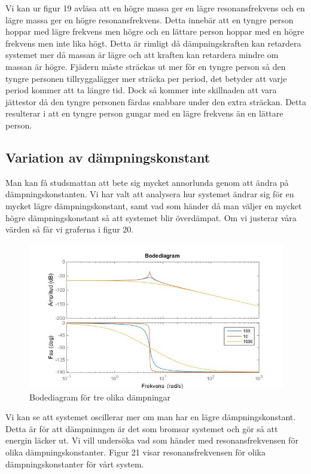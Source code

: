 \documentclass[10pt,a4paper]{article}
\begin{document}
Vi kan ur figur 19 avläsa att en högre massa ger en lägre resonansfrekvens och en lägre massa ger en högre resonansfrekvens. Detta innebär att en tyngre person hoppar med lägre frekvens men högre och en lättare person hoppar med en högre frekvens men inte lika högt. Detta är rimligt då dämpningskraften kan retardera systemet mer då massan är lägre och att kraften kan retardera mindre om massan är högre. Fjädern måste sträckas ut mer för en tyngre person så den tyngre personen tillryggalägger mer sträcka per period, det betyder att varje period kommer att ta längre tid. Dock så kommer inte skillnaden att vara jättestor då den tyngre personen färdas snabbare under den extra sträckan. Detta resulterar i att en tyngre person gungar med en lägre frekvens än en lättare person.

\subsection{Variation av dämpningskonstant}

Man kan få studsmattan att bete sig mycket annorlunda genom att ändra på dämpningskonstanten. Vi har valt att analysera hur systemet ändrar sig för en mycket lägre dämpningskonstant, samt vad som händer då man väljer en mycket högre dämpningskonstant så att systemet blir överdämpat. Om vi justerar våra värden så får vi graferna i figur 20.

\newpage

\begin{figure}[h]
\begin{center}
\includegraphics[scale=0.5]{Bode(dampning)}
\caption{Bodediagram för tre olika dämpningar}
\end{center}
\end{figure}

Vi kan se att systemet oscillerar mer om man har en lägre dämpningskonstant. Detta är för att dämpninngen är det som bromsar systemet och gör så att energin läcker ut. Vi vill undersöka vad som händer med resonansfrekvensen för olika dämpningskonstanter. Figur 21 visar resonansfrekvensen för olika dämpningskonstanter för vårt system.
\end{document}
